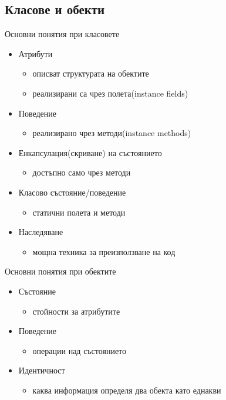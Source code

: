 \documentclass{beamer}
\begin{document}
\subsection{Класове и обекти}
\begin{frame}{Основни понятия при класовете}
  \transdissolve
  \begin{itemize}
  \item Атрибути
    \begin{itemize}
    \item описват структурата на обектите \pause
    \item реализирани са чрез полета(instance fields) \pause
    \end{itemize}
  \item Поведение \pause
    \begin{itemize}
    \item реализирано чрез методи(instance methods) \pause
    \end{itemize}
  \item Енкапсулация(скриване) на състоянието  \pause
    \begin{itemize}
    \item достъпно само чрез методи \pause
    \end{itemize}
  \item Класово състояние/поведение \pause
    \begin{itemize}
    \item статични полета и методи \pause
    \end{itemize}
  \item Наследяване
    \begin{itemize}
      \item мощна техника за преизползване на код
    \end{itemize}

  \end{itemize}
\end{frame}

\begin{frame}{Основни понятия при обектите}
  \transdissolve
  \begin{itemize}
  \item Състояние \pause
    \begin{itemize}
    \item стойности за атрибутите \pause
    \end{itemize}
  \item Поведение \pause
    \begin{itemize}
    \item операции над състоянието \pause
    \end{itemize}
  \item Идентичност \pause
    \begin{itemize}
    \item каква информация определя два обекта като еднакви \pause
    \end{itemize}
  \end{itemize}
\end{frame}
\end{document}
